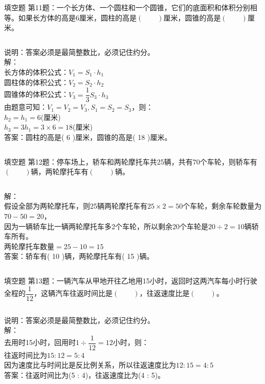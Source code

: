 \documentclass[aspectratio=169]{ctexbeamer} %
\begin{document}
\begin{frame}[t]{填空题}
第11题：一个长方体、一个圆柱和一个圆锥，它们的底面积和体积分别相等。如果长方体的高是6厘米，圆柱的高是$(\qquad)$厘米，圆锥的高是$(\qquad)$厘米。
\pause
\vspace{1em}
\begin{columns}
说明：答案必须是\alert{最简整数比}，必须记住\alert{约分}。\\
\vspace{1em}
解：\\
长方体的体积公式：$V_1 = S_1 \cdot h_1$ \\
圆柱体的体积公式：$V_2 = S_2 \cdot h_2$ \\
圆锥体的体积公式：$V_3 = \dfrac{1}{3} S_3 \cdot h_3$ \\
由题意可知：$V_1 = V_2 = V_3, S_1 = S_2 = S_3$，则：\\
$h_2 = h_1 = 6$(厘米) \\
$h_3 = 3h_1 = 3 \times 6 = 18$(厘米) \\
\vspace{1em}
答案：\alert{圆柱的高是( 6 )厘米，圆锥的高是( 18 )厘米。}
\end{columns}
\end{frame}

\begin{frame}[t]{填空题}
第12题：停车场上，轿车和两轮摩托车共25辆，共有70个车轮，则轿车有$(\qquad)$辆，两轮摩托车有$(\qquad)$辆。
\pause
\vspace{1em}
\begin{columns}
解：\\
假设全部为两轮摩托车，则25辆两轮摩托车有$25 \times 2 = 50$个车轮，剩余车轮数量为$70 - 50 = 20$，\\
因为一辆轿车比一辆两轮摩托车多2个车轮，所以剩余20个车轮是$20 \div 2 = 10$辆轿车所有。\\
两轮摩托车数量$ = 25 - 10  = 15$ \\
\vspace{1em}
答案：\alert{轿车有( 10 )辆，两轮摩托车有( 15 )辆。}
\end{columns}
\end{frame}

\begin{frame}[t]{填空题}
第13题：一辆汽车从甲地开往乙地用15小时，返回时这两汽车每小时行驶全程的$\dfrac{1}{12}$，这辆汽车往返时间比是$(\qquad)$，往返速度比是$(\qquad)$。
\pause
\vspace{1em}
\begin{columns}
说明：答案必须是\alert{最简整数比}，必须记住\alert{约分}。\\
\vspace{1em}
解：\\
去用时15小时，回用时$1 \div \dfrac{1}{12} = 12$小时，则：\\
往返时间比为$15 : 12 = 5 : 4$ \\
因为速度比与时间比是反比例关系，所以往返速度比为$12 : 15 = 4 : 5$ \\
\vspace{1em}
答案：\alert{往返时间比为(5 : 4)，往返速度比为(4 : 5)。}
\end{columns}
\end{frame}
\end{document}
